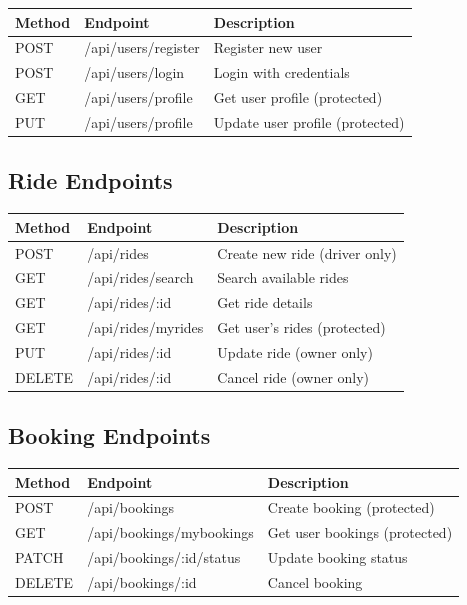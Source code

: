 \documentclass[12pt,a4paper]{article}
\begin{document}
\begin{table}[H]
\centering
\small
\begin{tabular}{|l|l|p{6cm}|}
\hline
\textbf{Method} & \textbf{Endpoint} & \textbf{Description} \\
\hline
POST & /api/users/register & Register new user \\
POST & /api/users/login & Login with credentials \\
GET & /api/users/profile & Get user profile (protected) \\
PUT & /api/users/profile & Update user profile (protected) \\
\hline
\end{tabular}
\end{table}

\subsection{Ride Endpoints}

\begin{table}[H]
\centering
\small
\begin{tabular}{|l|l|p{6cm}|}
\hline
\textbf{Method} & \textbf{Endpoint} & \textbf{Description} \\
\hline
POST & /api/rides & Create new ride (driver only) \\
GET & /api/rides/search & Search available rides \\
GET & /api/rides/:id & Get ride details \\
GET & /api/rides/myrides & Get user's rides (protected) \\
PUT & /api/rides/:id & Update ride (owner only) \\
DELETE & /api/rides/:id & Cancel ride (owner only) \\
\hline
\end{tabular}
\end{table}

\subsection{Booking Endpoints}

\begin{table}[H]
\centering
\small
\begin{tabular}{|l|l|p{6cm}|}
\hline
\textbf{Method} & \textbf{Endpoint} & \textbf{Description} \\
\hline
POST & /api/bookings & Create booking (protected) \\
GET & /api/bookings/mybookings & Get user bookings (protected) \\
PATCH & /api/bookings/:id/status & Update booking status \\
DELETE & /api/bookings/:id & Cancel booking \\
\hline
\end{tabular}
\end{table}
\end{document}
